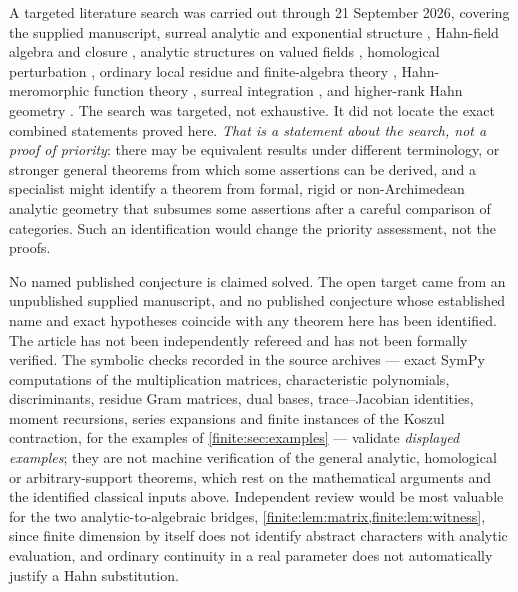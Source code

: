 \documentclass[11pt,letterpaper]{article}
\theoremstyle{definition}
\theoremstyle{remark}
\numberwithin{equation}{section}
\begin{document}
A targeted literature search was carried out through 21 September 2026, covering the supplied manuscript, surreal analytic and exponential structure \cite{finite:Alling,finite:vdDE,finite:BM}, Hahn-field algebra and closure \cite{finite:Neumann,finite:Poonen}, analytic structures on valued fields \cite{finite:CluckersLipshitz}, homological perturbation \cite{finite:Crainic}, ordinary local residue and finite-algebra theory \cite{finite:Demailly,finite:Kunz,finite:CattaniDickenstein,finite:CDS,finite:Cox,finite:NayakSastry}, Hahn-meromorphic function theory \cite{finite:MullerStrohmaier}, surreal integration \cite{finite:CostinEhrlich}, and higher-rank Hahn geometry \cite{finite:JoswigSmith}. The search was targeted, not exhaustive. It did not locate the exact combined statements proved here. \emph{That is a statement about the search, not a proof of priority}: there may be equivalent results under different terminology, or stronger general theorems from which some assertions can be derived, and a specialist might identify a theorem from formal, rigid or non-Archimedean analytic geometry that subsumes some assertions after a careful comparison of categories. Such an identification would change the priority assessment, not the proofs.

No named published conjecture is claimed solved. The open target came from an unpublished supplied manuscript, and no published conjecture whose established name and exact hypotheses coincide with any theorem here has been identified. The article has not been independently refereed and has not been formally verified. The symbolic checks recorded in the source archives --- exact SymPy computations of the multiplication matrices, characteristic polynomials, discriminants, residue Gram matrices, dual bases, trace--Jacobian identities, moment recursions, series expansions and finite instances of the Koszul contraction, for the examples of \cref{finite:sec:examples} --- validate \emph{displayed examples}; they are not machine verification of the general analytic, homological or arbitrary-support theorems, which rest on the mathematical arguments and the identified classical inputs above. Independent review would be most valuable for the two analytic-to-algebraic bridges, \cref{finite:lem:matrix,finite:lem:witness}, since finite dimension by itself does not identify abstract characters with analytic evaluation, and ordinary continuity in a real parameter does not automatically justify a Hahn substitution.

\end{document}
